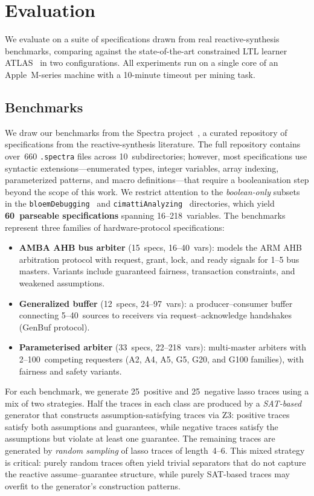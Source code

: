 \section{Evaluation}\label{sec:eval}

We evaluate \toolname on a suite of \GRone specifications drawn from
real reactive-synthesis benchmarks, comparing against the
state-of-the-art constrained LTL learner
ATLAS~\cite{ZhangCGD25} in two configurations.
All experiments run on a single core of an Apple~M-series machine
with a 10-minute timeout per mining task.

\subsection{Benchmarks}\label{sec:benchmarks}

We draw our benchmarks from the Spectra
project~\cite{MaozR21}, a curated repository of \GRone
specifications from the reactive-synthesis literature.
The full repository contains over~660 \texttt{.spectra} files across
10~subdirectories; however, most specifications use syntactic
extensions---enumerated types, integer variables, array indexing,
parameterized patterns, and macro definitions---that require a
booleanisation step beyond the scope of this work.
We restrict attention to the \emph{boolean-only} subsets in the
\texttt{bloemDebugging}~\cite{BloemJPPS12} and
\texttt{cimattiAnalyzing}~\cite{CimattiGMT20} directories,
which yield \textbf{60~parseable specifications} spanning
16--218~variables.
The benchmarks represent three families of
hardware-protocol specifications:

\begin{itemize}
\item \textbf{AMBA AHB bus arbiter} (15~specs, 16--40~vars):
  models the ARM AHB arbitration protocol with request, grant,
  lock, and ready signals for 1--5 bus masters.
  Variants include guaranteed fairness, transaction constraints, and
  weakened assumptions.
\item \textbf{Generalized buffer} (12~specs, 24--97~vars):
  a producer--consumer buffer connecting 5--40~sources to
  receivers via request--acknowledge handshakes (GenBuf protocol).
\item \textbf{Parameterised arbiter} (33~specs, 22--218~vars):
  multi-master arbiters with 2--100~competing requesters (A2, A4, A5,
  G5, G20, and G100 families), with fairness and safety variants.
\end{itemize}

For each benchmark, we generate 25~positive and 25~negative lasso
traces using a mix of two strategies.
Half the traces in each class are produced by a \emph{SAT-based}
generator that constructs assumption-satisfying traces via Z3:
positive traces satisfy both assumptions and guarantees, while
negative traces satisfy the assumptions but violate at least one
guarantee.
The remaining traces are generated by \emph{random sampling} of lasso
traces of length~4--6.
This mixed strategy is critical: purely random traces often yield
trivial separators that do not capture the reactive
assume--guarantee structure, while purely SAT-based traces may
overfit to the generator's construction patterns.

